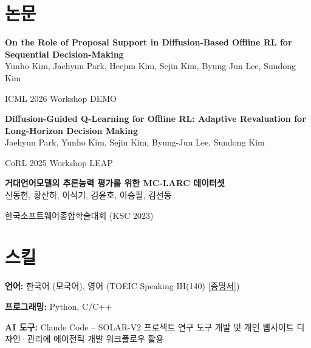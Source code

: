 \documentclass[10.5pt,a4paper]{article}
\newcommand{\pub}[4]{%
  \textbf{#1}\\
  #2\\
  {\raggedright\textcolor{textgray}{#3}#4\par}\vspace{0.6em}
}
\begin{document}
\section{논문}

\pub{On the Role of Proposal Support in Diffusion-Based Offline RL for Sequential Decision-Making}
{Yunho Kim, Jaehyun Park, Heejun Kim, Sejin Kim, Byung-Jun Lee, Sundong Kim}
{ICML 2026 Workshop DEMO}{}

\pub{Diffusion-Guided Q-Learning for Offline RL: Adaptive Revaluation for Long-Horizon Decision Making}
{Jaehyun Park, Yunho Kim, Sejin Kim, Byung-Jun Lee, Sundong Kim}
{CoRL 2025 Workshop LEAP}{}

\pub{거대언어모델의 추론능력 평가를 위한 MC-LARC 데이터셋}
{신동현, 황산하, 이석기, 김윤호, 이승필, 김선동}
{한국소프트웨어종합학술대회 (KSC 2023)}{\,\textbar\; 2023}

\section{스킬}

\textbf{언어:} 한국어 (모국어), 영어 (TOEIC Speaking IH(140) \href{https://qazyunho.github.io/website/certificates/TOEIC_Speaking_Score.pdf}{[증명서]})\par\vspace{0.4em}
\textbf{프로그래밍:} Python, C/C++\par\vspace{0.4em}
\textbf{AI 도구:} Claude Code -- SOLAR-V2 프로젝트 연구 도구 개발 및 개인 웹사이트 디자인·관리에 에이전틱 개발 워크플로우 활용
\end{document}
